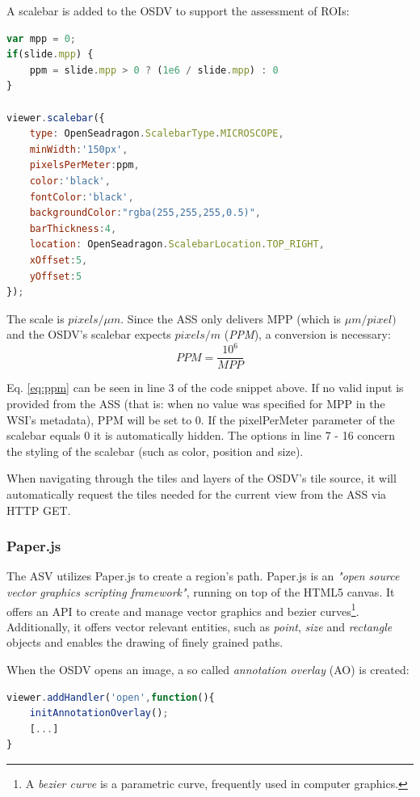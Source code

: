 A scalebar is added to the OSDV to support the assessment of ROIs:

\begin{lstlisting}[title=as{\textunderscore}viewer.js, frame=single, language=JavaScript]
var mpp = 0;
if(slide.mpp) {
	ppm = slide.mpp > 0 ? (1e6 / slide.mpp) : 0
}

viewer.scalebar({
	type: OpenSeadragon.ScalebarType.MICROSCOPE,
	minWidth:'150px',
	pixelsPerMeter:ppm,
	color:'black',
	fontColor:'black',
	backgroundColor:"rgba(255,255,255,0.5)",
	barThickness:4,
	location: OpenSeadragon.ScalebarLocation.TOP_RIGHT,
	xOffset:5,
	yOffset:5
});
\end{lstlisting}

The scale is $pixels/{\mu}m$. Since the ASS only delivers MPP (which is ${\mu}m/pixel)$ and the OSDV's scalebar expects $pixels/m$ (\emph{PPM}), a conversion is necessary:
\begin{equation}\label{eq:ppm}
	PPM = \frac{10^6}{MPP}
\end{equation}

Eq. \ref{eq:ppm} can be seen in line 3 of the code snippet above.  If no valid input is provided from the ASS (that is: when no value was specified for MPP in the WSI's metadata), PPM will be set to 0. If the pixelPerMeter parameter of the scalebar equals 0 it is automatically hidden\cite{web:openseadragon}. The options in line 7 - 16 concern the styling of the scalebar (such as color, position and size).

When navigating through the tiles and layers of the OSDV's tile source, it will automatically request the tiles needed for the current view from the ASS via HTTP GET\cite{web:openseadragon}.


\subsubsection{Paper.js}
The ASV utilizes Paper.js to create a region's path. Paper.js is an \emph{"open source vector graphics scripting framework"}, running on top of the HTML5 canvas\cite{web:paper}. It offers an API to create and manage vector graphics and bezier curves\footnote{
	A \emph{bezier curve} is a parametric curve, frequently used in computer graphics\cite{Strang03}.
}. Additionally, it offers vector relevant entities, such as \emph{point}, \emph{size} and \emph{rectangle} objects and enables the drawing of finely grained paths.

When the OSDV opens an image, a so called \emph{annotation overlay} (AO) is created:
\begin{lstlisting}[title=Excerpt from \texttt{initAnnotationService()} in as{\textunderscore}viewer.js, frame=single, language=JavaScript]
viewer.addHandler('open',function(){
	initAnnotationOverlay();
	[...]
}
\end{lstlisting}

